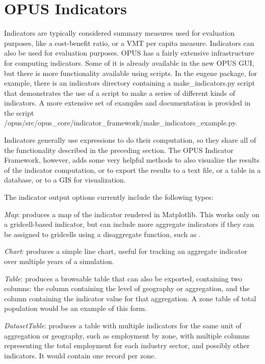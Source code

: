 \section{OPUS Indicators}

Indicators are typically considered summary measures used for evaluation purposes, like a cost-benefit ratio, or a VMT per capita measure.  Indicators can also be used for evaluation purposes.  OPUS has a fairly extensive infrastructure for computing indicators.  Some of it is already available in the new OPUS GUI, but there is more functionality available using scripts.  In the eugene package, for example, there is an indicators directory containing a make\_indicators.py script that demonstrates the use of a script to make a series of different kinds of indicators.  A more extensive set of examples and documentation is provided in the script  /opus/src/opus\_core/indicator\_framework/make\_indicators\_example.py.

Indicators generally use expressions to do their computation, so they share all of the functionality described in the preceding section.  The OPUS Indicator Framework, however, adds some very helpful methods to also visualize the results of the indicator computation, or to export the results to a text file, or a table in a database, or to a GIS for visualization.

The indicator output options currently include the following types:

\squishlist
\item \emph{Map}: produces a map of the indicator rendered in Matplotlib. This works only on a gridcell-based indicator, but can include more aggregate indicators if they can be assigned to gridcells using a disaggregate function, such as .
\item \emph{Chart}: produces a simple line chart, useful for tracking an aggregate indicator over multiple years of a simulation.
\item \emph{Table}: produces a browsable table that can also be exported, containing two columns: the column containing the level of geography or aggregation, and the column containing the indicator value for that aggregation.  A zone table of total population would be an example of this form.
\item \emph{DatasetTable}: produces a table with multiple indicators for the same unit of aggregation or geography, such as employment by zone, with multiple columns representing the total employment for each industry sector, and possibly other indicators.  It would contain one record per zone.
\squishend


